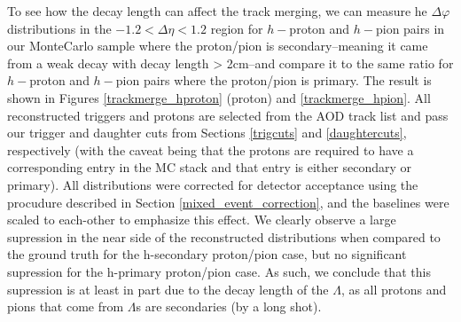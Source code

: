 \documentclass[ALICE,manyauthors]{ALICE_analysis_notes}
\begin{document}
To see how the decay length can affect the track merging, we can measure he $\Delta\varphi$ distributions in the $-1.2 < \Delta\eta < 1.2$ region for $h-$proton and $h-$pion pairs in our MonteCarlo sample where the proton/pion is secondary--meaning it came from a weak decay with decay length > 2cm--and compare it to the same ratio for $h-$proton and $h-$pion pairs where the proton/pion is primary. The result is shown in Figures \ref{trackmerge_hproton} (proton) and \ref{trackmerge_hpion}. All reconstructed triggers and protons are selected from the AOD track list and pass our trigger and daughter cuts from Sections \ref{trigcuts} and \ref{daughtercuts}, respectively (with the caveat being that the protons are required to have a corresponding entry in the MC stack and that entry is either secondary or primary). All distributions were corrected for detector acceptance using the procudure described in Section \ref{mixed_event_correction}, and the baselines were scaled to each-other to emphasize this effect. We clearly observe a large supression in the near side of the reconstructed distributions when compared to the ground truth for the h-secondary proton/pion case, but no significant supression for the h-primary proton/pion case. As such, we conclude that this supression is at least in part due to the decay length of the $\Lambda$, as all protons and pions that come from $\Lambda$s are secondaries (by a long shot).
\end{document}
